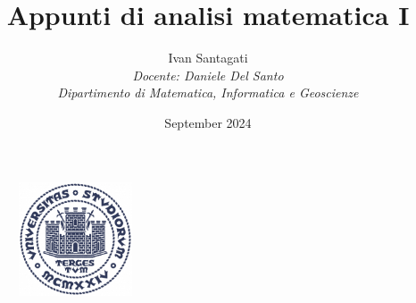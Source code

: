 \documentclass{article}
\title{\textbf{Appunti di analisi matematica I}}
\author{Ivan Santagati  \\ 
\vspace{2em}
\textit{Docente: Daniele Del Santo} \\
\textit{Dipartimento di Matematica, Informatica e Geoscienze}}
\date{September 2024}
\begin{document}
\maketitle
\thispagestyle{empty}%

\begin{figure}[b]%
    \centering
    \includegraphics[width=0.3\textwidth]{img/units_sigillo.png} %
\end{figure}
\newpage


\tableofcontents%



\end{document}
